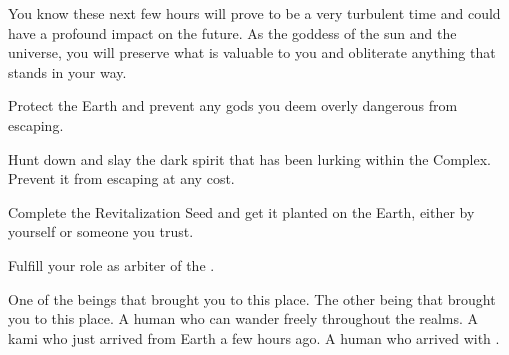 \documentclass[char]{guardians}
\begin{document}
You know these next few hours will prove to be a very turbulent time and could have a profound impact on the future. As the goddess of the sun and the universe, you will preserve what is valuable to you and obliterate anything that stands in your way.

\begin{itemz}[Goals]
  \item Protect the Earth and prevent any gods you deem overly dangerous from escaping.
	\item Hunt down and slay the dark spirit that has been lurking within the Complex. Prevent it from escaping at any cost.
	\item Complete the Revitalization Seed and get it planted on the Earth, either by yourself or someone you trust.
	\item Fulfill your role as arbiter of the \pGames{}.
\end{itemz}

\begin{contacts}
   One of the beings that brought you to this place.
	 The other being that brought you to this place.
	\contact{\cJascha{}} A human who can wander freely throughout the realms.
	\contact{\cUnity{}} A kami who just arrived from Earth a few hours ago.
	\contact{\cKachiko{}} A human who arrived with \cUnity{}.
\end{contacts}
\end{document}
